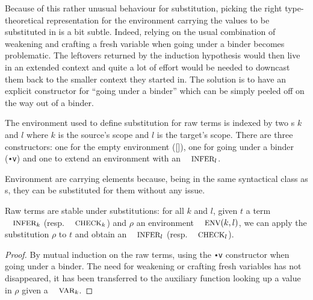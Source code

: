 \documentclass[a4paper,UKenglish]{lipics-v2016}
\begin{document}
Because of this rather unusual behaviour for substitution, picking
the right type-theoretical representation for the environment
carrying the values to be substituted in is a bit subtle. Indeed,
relying on the usual combination of weakening and crafting a fresh
variable when going under a binder becomes problematic. The leftovers
returned by the induction hypothesis would then live in an extended
context and quite a lot of effort would be needed to downcast them
back to the smaller context they started in. The solution is to have
an explicit constructor for ``going under a binder'' which can be
simply peeled off on the way out of a binder.

\begin{definition}The environment \Env{} used to define substitution
for raw terms is indexed by two \Nat{}s $k$ and $l$ where $k$ is the
source's scope and $l$ is the target's scope. There are three constructors:
one for the empty environment ([]), one for going under a binder (\texttt{∙v})
and one to extend an environment with an $\Inferable{l}$.
\end{definition}

Environment are carrying \Inferable{} elements because, being in the
same syntactical class as \Var{}s, they can be substituted for them
without any issue.

\begin{lemma}Raw terms are stable under substitutions: for all $k$ and
$l$, given $t$ a term $\Inferable{k}$ (resp. $\Checkable{k}$) and $ρ$
an environment $\Env{}(k,l)$, we can apply the substitution $ρ$ to $t$
and obtain an $\Inferable{l}$ (resp. $\Checkable{l}$).
\end{lemma}
\begin{proof}By mutual induction on the raw terms, using the \texttt{∙v}
\Env{} constructor when going under a binder. The need for weakening or
crafting fresh variables has not disappeared, it has been transferred to
the auxiliary function looking up a value in $ρ$ given a $\Var{k}$.
\end{proof}
\end{document}
